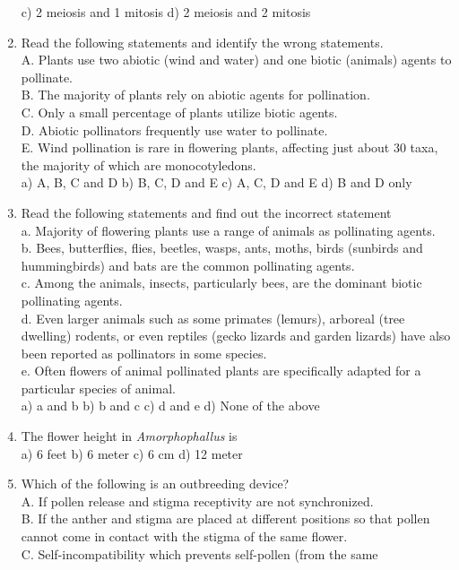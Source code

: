 \begin{enumerate}
  c) 2 meiosis and 1 mitosis d) 2 meiosis and 2 mitosis
\item
  Read the following statements and identify the wrong statements.\\
  A. Plants use two abiotic (wind and water) and one biotic (animals)
  agents to pollinate.\\
  B. The majority of plants rely on abiotic agents for pollination.\\
  C. Only a small percentage of plants utilize biotic agents.\\
  D. Abiotic pollinators frequently use water to pollinate.\\
  E. Wind pollination is rare in flowering plants, affecting just about
  30 taxa, the majority of which are monocotyledons.\\
  a) A, B, C and D b) B, C, D and E c) A, C, D and E d) B and D only
\item
  Read the following statements and find out the incorrect statement\\
  a. Majority of flowering plants use a range of animals as pollinating
  agents.\\
  b. Bees, butterflies, flies, beetles, wasps, ants, moths, birds
  (sunbirds and hummingbirds) and bats are the common pollinating
  agents.\\
  c. Among the animals, insects, particularly bees, are the dominant
  biotic pollinating agents.\\
  d. Even larger animals such as some primates (lemurs), arboreal (tree
  dwelling) rodents, or even reptiles (gecko lizards and garden lizards)
  have also been reported as pollinators in some species.\\
  e. Often flowers of animal pollinated plants are specifically adapted
  for a particular species of animal.\\
  a) a and b b) b and c c) d and e d) None of the above
\item
  The flower height in \emph{Amorphophallus} is\\
  a) 6 feet b) 6 meter c) 6 cm d) 12 meter
\item
  Which of the following is an outbreeding device?\\
  A. If pollen release and stigma receptivity are not synchronized.\\
  B. If the anther and stigma are placed at different positions so that
  pollen cannot come in contact with the stigma of the same flower.\\
  C. Self-incompatibility which prevents self-pollen (from the same

\end{enumerate}
